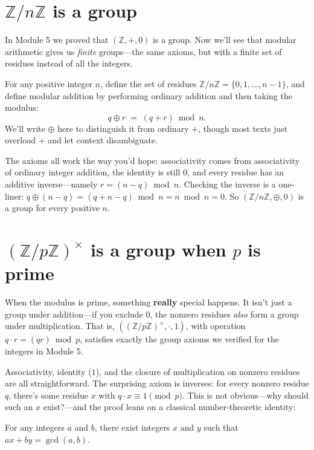 \documentclass[11pt]{article}
\begin{document}
\section{\texorpdfstring{$\mathbb{Z}/n\mathbb{Z}$ is a group}{Z/nZ is a group}}
In Module 5 we proved that $(\mathbb{Z}, +, 0)$ is a group. Now we'll see that modular arithmetic gives us \emph{finite} groups---the same axioms, but with a finite set of residues instead of all the integers.

For any positive integer $n$, define the set of residues $\mathbb{Z}/n\mathbb{Z} = \{0, 1, \ldots, n-1\}$, and define modular addition by performing ordinary addition and then taking the modulus:
\[
  q \oplus r \;=\; (q + r) \bmod n.
\]
We'll write $\oplus$ here to distinguish it from ordinary $+$, though most texts just overload $+$ and let context disambiguate.

The axioms all work the way you'd hope: associativity comes from associativity of ordinary integer addition, the identity is still $0$, and every residue has an additive inverse---namely $r = (n - q) \bmod n$. Checking the inverse is a one-liner: $q \oplus (n - q) = (q + n - q) \bmod n = n \bmod n = 0$. So $(\mathbb{Z}/n\mathbb{Z}, \oplus, 0)$ is a group for every positive $n$.

\section{\texorpdfstring{$(\mathbb{Z}/p\mathbb{Z})^{\times}$ is a group when $p$ is prime}{Units mod p form a group when p is prime}}
When the modulus is prime, something \textbf{really} special happens. It isn't just a group under addition---if you exclude $0$, the nonzero residues \emph{also} form a group under multiplication. That is, $((\mathbb{Z}/p\mathbb{Z})^{\times}, \cdot, 1)$, with operation $q \cdot r = (qr) \bmod p$, satisfies exactly the group axioms we verified for the integers in Module 5.

Associativity, identity ($1$), and the closure of multiplication on nonzero residues are all straightforward. The surprising axiom is inverses: for every nonzero residue $q$, there's some residue $x$ with $q \cdot x \equiv 1 \pmod p$. This is not obvious---why should such an $x$ exist?---and the proof leans on a classical number-theoretic identity:

\begin{theorem}
For any integers $a$ and $b$, there exist integers $x$ and $y$ such that $ax + by = \gcd(a, b)$.
\end{theorem}
\end{document}
